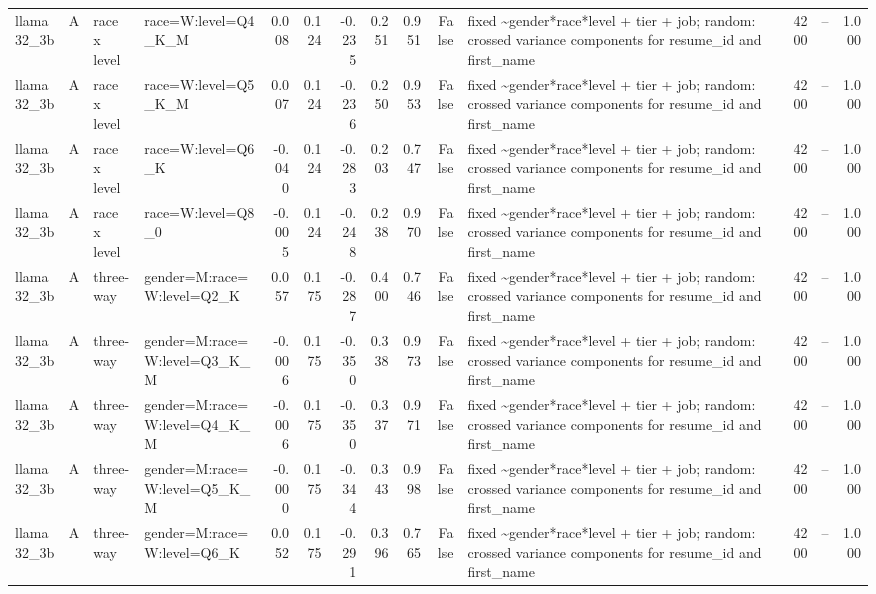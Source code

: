 \begin{tabular}{llllrrrrrrlrlr}
llama32\_3b & A & race x level & race=W:level=Q4\_K\_M & 0.008 & 0.124 & -0.235 & 0.251 & 0.951 & False & fixed \textasciitilde \space gender*race*level + tier + job; random: crossed variance components for resume\_id and first\_name & 4200 & -- & 1.000 \\
llama32\_3b & A & race x level & race=W:level=Q5\_K\_M & 0.007 & 0.124 & -0.236 & 0.250 & 0.953 & False & fixed \textasciitilde \space gender*race*level + tier + job; random: crossed variance components for resume\_id and first\_name & 4200 & -- & 1.000 \\
llama32\_3b & A & race x level & race=W:level=Q6\_K & -0.040 & 0.124 & -0.283 & 0.203 & 0.747 & False & fixed \textasciitilde \space gender*race*level + tier + job; random: crossed variance components for resume\_id and first\_name & 4200 & -- & 1.000 \\
llama32\_3b & A & race x level & race=W:level=Q8\_0 & -0.005 & 0.124 & -0.248 & 0.238 & 0.970 & False & fixed \textasciitilde \space gender*race*level + tier + job; random: crossed variance components for resume\_id and first\_name & 4200 & -- & 1.000 \\
llama32\_3b & A & three-way & gender=M:race=W:level=Q2\_K & 0.057 & 0.175 & -0.287 & 0.400 & 0.746 & False & fixed \textasciitilde \space gender*race*level + tier + job; random: crossed variance components for resume\_id and first\_name & 4200 & -- & 1.000 \\
llama32\_3b & A & three-way & gender=M:race=W:level=Q3\_K\_M & -0.006 & 0.175 & -0.350 & 0.338 & 0.973 & False & fixed \textasciitilde \space gender*race*level + tier + job; random: crossed variance components for resume\_id and first\_name & 4200 & -- & 1.000 \\
llama32\_3b & A & three-way & gender=M:race=W:level=Q4\_K\_M & -0.006 & 0.175 & -0.350 & 0.337 & 0.971 & False & fixed \textasciitilde \space gender*race*level + tier + job; random: crossed variance components for resume\_id and first\_name & 4200 & -- & 1.000 \\
llama32\_3b & A & three-way & gender=M:race=W:level=Q5\_K\_M & -0.000 & 0.175 & -0.344 & 0.343 & 0.998 & False & fixed \textasciitilde \space gender*race*level + tier + job; random: crossed variance components for resume\_id and first\_name & 4200 & -- & 1.000 \\
llama32\_3b & A & three-way & gender=M:race=W:level=Q6\_K & 0.052 & 0.175 & -0.291 & 0.396 & 0.765 & False & fixed \textasciitilde \space gender*race*level + tier + job; random: crossed variance components for resume\_id and first\_name & 4200 & -- & 1.000 \\

\end{tabular}
